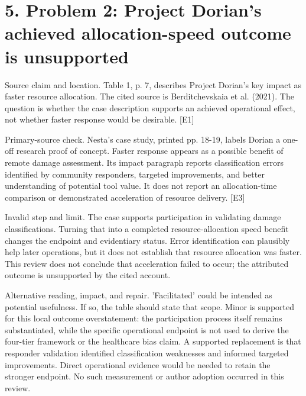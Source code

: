 \documentclass[10pt]{article}
\begin{document}
\section*{5. Problem 2: Project Dorian’s achieved allocation-speed outcome is unsupported}
Source claim and location. Table 1, p. 7, describes Project Dorian’s key impact as faster resource allocation. The cited source is Berditchevskaia et al. (2021). The question is whether the case description supports an achieved operational effect, not whether faster response would be desirable. [E1]\par
Primary-source check. Nesta’s case study, printed pp. 18-19, labels Dorian a one-off research proof of concept. Faster response appears as a possible benefit of remote damage assessment. Its impact paragraph reports classification errors identified by community responders, targeted improvements, and better understanding of potential tool value. It does not report an allocation-time comparison or demonstrated acceleration of resource delivery. [E3]\par
Invalid step and limit. The case supports participation in validating damage classifications. Turning that into a completed resource-allocation speed benefit changes the endpoint and evidentiary status. Error identification can plausibly help later operations, but it does not establish that resource allocation was faster. This review does not conclude that acceleration failed to occur; the attributed outcome is unsupported by the cited account.\par
Alternative reading, impact, and repair. ’Facilitated’ could be intended as potential usefulness. If so, the table should state that scope. Minor is supported for this local outcome overstatement: the participation process itself remains substantiated, while the specific operational endpoint is not used to derive the four-tier framework or the healthcare bias claim. A supported replacement is that responder validation identified classification weaknesses and informed targeted improvements. Direct operational evidence would be needed to retain the stronger endpoint. No such measurement or author adoption occurred in this review.\par
\end{document}
